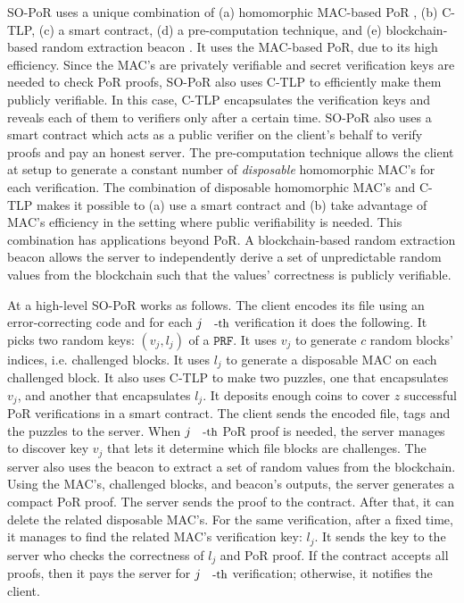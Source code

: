 SO-PoR uses a unique combination of (a) homomorphic MAC-based PoR \cite{DBLP:conf/asiacrypt/ShachamW08}, (b) C-TLP,  (c) a smart contract,  (d) a pre-computation technique, and (e) blockchain-based random extraction beacon \cite{DBLP:journals/iacr/AbadiCKZ19,armknecht2014outsourced}. It uses the MAC-based PoR, due to its high efficiency. Since the MAC's are privately verifiable and secret verification keys are needed to check PoR proofs, SO-PoR also uses C-TLP to efficiently make them publicly verifiable. In this case, C-TLP encapsulates the verification keys and reveals each of them to verifiers only after a certain time. SO-PoR also uses a smart contract which acts as a public verifier on the client's behalf to verify proofs and pay an honest server. The pre-computation technique allows the client at setup to generate a constant number of \emph{disposable} homomorphic MAC's for each verification.  The combination of disposable homomorphic MAC's and C-TLP  makes it possible to (a) use a smart contract  and (b) take advantage of MAC's efficiency in the setting where public verifiability is needed. This combination has applications beyond PoR.  A blockchain-based random extraction beacon allows the server to independently  derive a set of unpredictable random values from the blockchain such that the values' correctness is publicly verifiable. 



At a high-level  SO-PoR works as follows. The client encodes its file using an error-correcting code and  for each $j\text{\small{-th}}$ verification it does the following. It picks two   random keys: $(v_{\scriptscriptstyle j},l_{\scriptscriptstyle j})$ of a $\mathtt{PRF}$. It uses $v_{\scriptscriptstyle j}$ to generate $c$ random blocks' indices, i.e. challenged blocks. It uses  $l_{\scriptscriptstyle j}$ to generate a disposable MAC on each challenged block. It also uses C-TLP to make two puzzles, one that encapsulates $v_{\scriptscriptstyle j}$, and  another that encapsulates $l_{\scriptscriptstyle j}$. It deposits enough coins to cover $z$ successful PoR verifications in a smart contract. The client sends the encoded file, tags and the puzzles to the server. When $j\text{\small{-th}}$ PoR proof is needed, the server manages to discover key $v_{\scriptscriptstyle j}$ that lets it determine which file blocks are challenges. The server also uses the beacon to extract a set of random values from the blockchain. Using the MAC's,  challenged blocks, and  beacon's outputs, the server generates a compact PoR proof. The server sends the proof to the contract. After that, it can delete the related disposable MAC's.  For the same verification, after a fixed time, it manages to find the related MAC's verification key: $l_{\scriptscriptstyle j}$. It sends the key to the server who checks the correctness of $l_{\scriptscriptstyle j}$ and  PoR proof. If the contract accepts all proofs, then it pays the server  for $j\text{\small{-th}}$ verification; otherwise, it notifies the client.  





